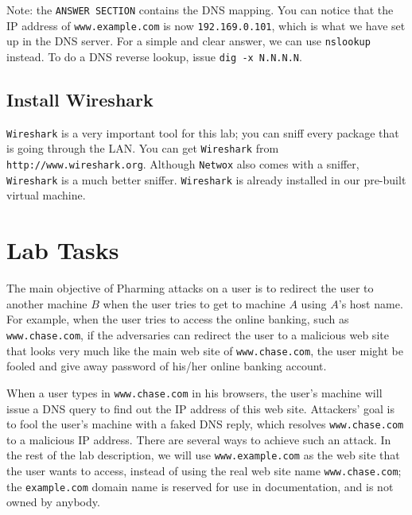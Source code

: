 Note: the {\tt ANSWER SECTION} contains the DNS mapping. You can notice that
the IP address of {\tt www.example.com} is now {\tt 192.169.0.101}, which
is what we have set up in the DNS server.
For a simple and clear answer,
we can use {\tt nslookup} instead. 
To do a DNS reverse lookup, issue {\tt dig -x N.N.N.N}.


\subsection{Install Wireshark}

{\tt Wireshark} is a very important tool for this lab; you can sniff every package 
that is going through the LAN.  You can get {\tt Wireshark} from 
\texttt{http://www.wireshark.org}. Although {\tt Netwox} also comes with
a sniffer, {\tt Wireshark} is a much better sniffer. {\tt Wireshark} is already
installed in our pre-built virtual machine.



\section{Lab Tasks}

%

The main objective of Pharming attacks on a user is to redirect the user
to another machine $B$ when the user tries to get to machine $A$ using
$A$'s host name. For example, when the user tries to access the online banking,
such as {\tt www.chase.com}, if the adversaries can redirect the user 
to a malicious web site that looks very much like the main web site 
of {\tt www.chase.com}, the user might be fooled and give away password
of his/her online banking account.

When a user types in {\tt www.chase.com} in his browsers, the user's machine will issue
a DNS query to find out the IP address of this web site. Attackers' goal
is to fool the user's machine with a faked DNS reply, which resolves
{\tt www.chase.com} to a malicious IP address. There are several ways
to achieve such an attack. In the rest of the lab description, we will 
use {\tt www.example.com} as the web site that the user wants to access,
instead of using the real web site name {\tt www.chase.com}; 
the {\tt example.com} domain name is reserved for use in 
documentation, and is not owned by anybody. 


